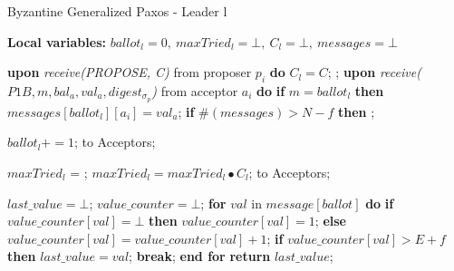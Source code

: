 \begin{algorithm} 
	\caption{Byzantine Generalized Paxos - Leader l}
	\label{BFT-Lead}
	\textbf{Local variables:} $ballot_l = 0,\ maxTried_l = \bot,\ C_l = \bot,\ messages = \bot$
	\begin{algorithmic}[1]
		\State \textbf{upon} \textit{receive(PROPOSE, C)} from proposer $p_i$ \textbf{do} 
		\State \hspace{\algorithmicindent} $C_l = C$;
		\State \hspace{\algorithmicindent} ;
		\State
		\State \textbf{upon} \textit{receive($P1B, m, bal_a, val_a, digest_{\sigma_p}$)} from acceptor $a_i$ \textbf{do}
		\State \hspace{\algorithmicindent} \textbf{if} $m = ballot_l$ \textbf{then}
		\State \hspace{\algorithmicindent}\hspace{\algorithmicindent}\hspace{\algorithmicindent}  $messages[ballot_l][a_i] = val_a$;
		\State \hspace{\algorithmicindent} \textbf{if} $\#(messages) > N-f$ \textbf{then} 
		\State \hspace{\algorithmicindent}\hspace{\algorithmicindent} ;

		\State
		\State $ballot_l \mathrel{+{=}} 1$;
		\State {} to Acceptors;
		\EndFunction
		
		\State
		\State $maxTried_l$ = ;
		\State $maxTried_l = maxTried_l \bullet C_l$;
		\State {} to Acceptors;
		\EndFunction
		
		\State
		\State $last\_value = \bot$;
		\State $value\_counter = \bot$;
		\State \textbf{for} $val$ in $message[ballot]$ \textbf{do}
		\State \hspace{\algorithmicindent}\textbf{if} $value\_counter[val] = \bot$ \textbf{then}
		\State \hspace{\algorithmicindent}\hspace{\algorithmicindent}$value\_counter[val] = 1$;
		\State \hspace{\algorithmicindent}\textbf{else}
		\State \hspace{\algorithmicindent}\hspace{\algorithmicindent}$value\_counter[val] = value\_counter[val] + 1$; 
		\State
		\State \hspace{\algorithmicindent}\textbf{if} $value\_counter[val] > E+f$ \textbf{then}
		\State \hspace{\algorithmicindent}\hspace{\algorithmicindent}$last\_value = val$;
		\State \hspace{\algorithmicindent}\hspace{\algorithmicindent}\textbf{break};
		\State \textbf{end for}
		\State \textbf{return} $last\_value$;
		\EndFunction
		

\end{algorithmic}
\end{algorithm}
